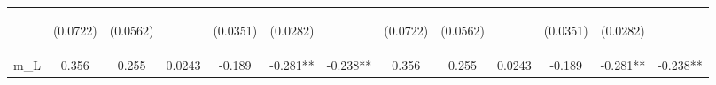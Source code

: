 \documentclass[]{article}
\begin{document}
\begin{center}
\begin{tabular}{lcccccccccccc}
\vspace{4pt} & \begin{footnotesize}(0.0722)\end{footnotesize} & \begin{footnotesize}(0.0562)\end{footnotesize} & \begin{footnotesize}\end{footnotesize} & \begin{footnotesize}(0.0351)\end{footnotesize} & \begin{footnotesize}(0.0282)\end{footnotesize} & \begin{footnotesize}\end{footnotesize} & \begin{footnotesize}(0.0722)\end{footnotesize} & \begin{footnotesize}(0.0562)\end{footnotesize} & \begin{footnotesize}\end{footnotesize} & \begin{footnotesize}(0.0351)\end{footnotesize} & \begin{footnotesize}(0.0282)\end{footnotesize} & \begin{footnotesize}\end{footnotesize} \\
m\_L & 0.356 & 0.255 & 0.0243 & -0.189 & -0.281** & -0.238** & 0.356 & 0.255 & 0.0243 & -0.189 & -0.281** & -0.238** \\

\end{tabular}
\end{center}
\end{document}
